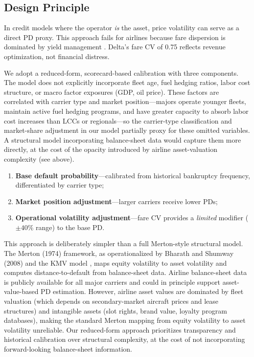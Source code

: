 \documentclass[12pt,a4paper]{article}
\begin{document}
\subsection{Design Principle}

In credit models where the operator \emph{is} the asset, price volatility can serve as a direct PD proxy. This approach fails for airlines because fare dispersion is dominated by yield management \cite{belobaba2015}. Delta's fare CV of 0.75 reflects revenue optimization, not financial distress.

We adopt a reduced-form, scorecard-based calibration with three components. The model does not explicitly incorporate fleet age, fuel hedging ratios, labor cost structure, or macro factor exposures (GDP, oil price). These factors are correlated with carrier type and market position---majors operate younger fleets, maintain active fuel hedging programs, and have greater capacity to absorb labor cost increases than LCCs or regionals---so the carrier-type classification and market-share adjustment in our model partially proxy for these omitted variables. A structural model incorporating balance-sheet data would capture them more directly, at the cost of the opacity introduced by airline asset-valuation complexity (see above).

\begin{enumerate}[label=(\roman*)]
    \item \textbf{Base default probability}---calibrated from historical bankruptcy frequency, differentiated by carrier type;
    \item \textbf{Market position adjustment}---larger carriers receive lower PDs;
    \item \textbf{Operational volatility adjustment}---fare CV provides a \textit{limited} modifier ($\pm 40\%$ range) to the base PD.
\end{enumerate}

This approach is deliberately simpler than a full Merton-style structural model. The Merton (1974) framework, as operationalized by Bharath and Shumway (2008) and the KMV model \cite{crosbie2003}, maps equity volatility to asset volatility and computes distance-to-default from balance-sheet data. Airline balance-sheet data is publicly available for all major carriers and could in principle support asset-value-based PD estimation. However, airline asset values are dominated by fleet valuation (which depends on secondary-market aircraft prices and lease structures) and intangible assets (slot rights, brand value, loyalty program databases), making the standard Merton mapping from equity volatility to asset volatility unreliable. Our reduced-form approach prioritizes transparency and historical calibration over structural complexity, at the cost of not incorporating forward-looking balance-sheet information.
\end{document}
